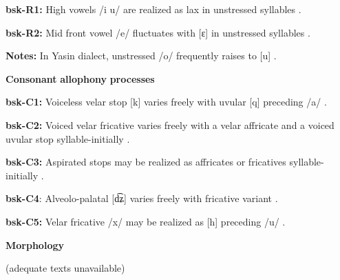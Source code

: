 \documentclass[output=paper]{langsci/langscibook}
\begin{document}
\begin{styleBody}
\textbf{bsk-R1:} High vowels /i u/ are realized as lax in unstressed syllables \citep[1029]{Anderson1997}.
\end{styleBody}

\begin{styleBody}
\textbf{bsk-R2:} Mid front vowel /e/ fluctuates with [ɛ] in unstressed syllables \citep[1029]{Anderson1997}.
\end{styleBody}

\begin{styleBody}
\textbf{Notes:} In Yasin dialect, unstressed /o/ frequently raises to [u] \citep[1038]{Anderson1997}.
\end{styleBody}

\begin{styleBody}
\textbf{Consonant} \textbf{allophony} \textbf{processes}
\end{styleBody}

\begin{styleBody}
\textbf{bsk-C1:} Voiceless velar stop [k] varies freely with uvular [q] preceding /a/ \citep[1025]{Anderson1997}.
\end{styleBody}

\begin{styleBody}
\textbf{bsk-C2:} Voiced velar fricative varies freely with a velar affricate and a voiced uvular stop syllable-initially \citep[1025]{Anderson1997}.
\end{styleBody}

\begin{styleBody}
\textbf{bsk-C3:} Aspirated stops may be realized as affricates or fricatives syllable-initially \citep[1025]{Anderson1997}.
\end{styleBody}

\begin{styleBody}
\textbf{bsk-C4}: Alveolo-palatal [d͡ʑ] varies freely with fricative variant \citep[1025]{Anderson1997}.
\end{styleBody}

\begin{styleBody}
\textbf{bsk-C5:} Velar fricative /x/ may be realized as [h] preceding /u/ \citep[1025]{Anderson1997}.
\end{styleBody}

\begin{styleBody}
\textbf{Morphology}
\end{styleBody}

\begin{styleBody}
(adequate texts unavailable)
\end{styleBody}
\end{document}
